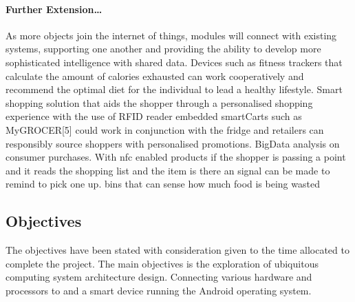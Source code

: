 \documentclass[a4paper, 11pt]{article}
\begin{document}
\paragraph{Further Extension\dots} As more objects join the internet of things, modules will connect with existing systems, supporting one another and providing the ability to develop more sophisticated intelligence with shared data. Devices such as fitness trackers that calculate the amount of calories exhausted can work cooperatively and recommend the optimal diet for the individual to lead a healthy lifestyle. Smart shopping solution that aids the shopper through a personalised shopping experience with the use of RFID reader embedded smartCarts such as MyGROCER[5] could work in conjunction with the fridge and retailers can responsibly source shoppers with personalised promotions. BigData analysis on consumer purchases. With nfc enabled products if the shopper is passing a point and it reads the shopping list and the item is there an signal can be made to remind to pick one up. bins that can sense how much food is being wasted

\fi
\subsection{Objectives}

The objectives have been stated with consideration given to the time allocated to complete the project. The main objectives is the exploration of ubiquitous computing system architecture design. Connecting various hardware and processors to and a smart device running the Android operating system. 
\end{document}
